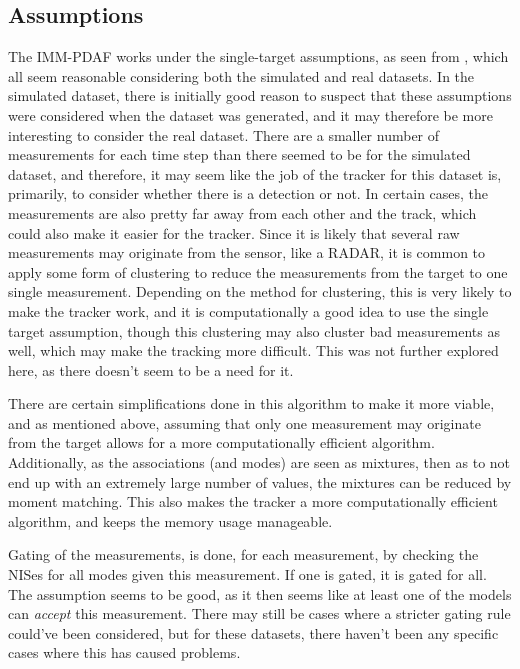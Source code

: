 \subsection*{Assumptions}
The IMM-PDAF works under the single-target assumptions, as seen from \cite[p. 105]{Edmund}, which all seem reasonable considering both the simulated and real datasets. In the simulated dataset, there is initially good reason to suspect that these assumptions were considered when the dataset was generated, and it may therefore be more interesting to consider the real dataset. There are a smaller number of measurements for each time step than there seemed to be for the simulated dataset, and therefore, it may seem like the job of the tracker for this dataset is, primarily, to consider whether there is a detection or not. In certain cases, the measurements are also pretty far away from each other and the track, which could also make it easier for the tracker. Since it is likely that several raw measurements may originate from the sensor, like a RADAR, it is common to apply some form of clustering to reduce the measurements from the target to one single measurement. Depending on the method for clustering, this is very likely to make the tracker work, and it is computationally a good idea to use the single target assumption, though this clustering may also cluster bad measurements as well, which may make the tracking more difficult. This was not further explored here, as there doesn't seem to be a need for it. 

There are certain simplifications done in this algorithm to make it more viable, and as mentioned above, assuming that only one measurement may originate from the target allows for a more computationally efficient algorithm. 
Additionally, as the associations (and modes) are seen as mixtures, then as to not end up with an extremely large number of values, the mixtures can be reduced by moment matching. This also makes the tracker a more computationally efficient algorithm, and keeps the memory usage manageable. 

Gating of the measurements, is done, for each measurement, by checking the NISes for all modes given this measurement. If one is gated, it is gated for all. The assumption seems to be good, as it then seems like at least one of the models can \textit{accept} this measurement. There may still be cases where a stricter gating rule could've been considered, but for these datasets, there haven't been any specific cases where this has caused problems. 

